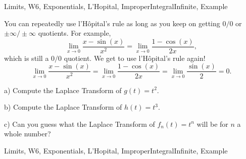 \begin{tagblock}{Limits, W6, Exponentials, L'Hopital, ImproperIntegralInfinite, Example}
\begin{question}
	You can repeatedly use l'H\^opital's rule as long as you keep on getting $0/0$ or $\pm\infty/\pm\infty$ quotients. For example,
\[
\lim_{x\to 0}\frac{x-\sin(x)}{x^2}=\lim_{x\to 0}\frac{1-\cos(x)}{2x},
\]
which is still a $0/0$ quotient. We get to use l'H\^opital's rule again!
\[
\lim_{x\to 0}\frac{x-\sin(x)}{x^2}=\lim_{x\to 0}\frac{1-\cos(x)}{2x}=\lim_{x\to 0} \frac {\sin(x)}2=0.
\]

\bigskip

a) Compute the Laplace Transform of $g(t)=t^2$. 

\bigskip

b) Compute the Laplace Transform of $h(t)=t^3$. 

\bigskip

c) Can you guess what the Laplace Transform of $f_n(t)=t^n$ will be for $n$ a whole number?
	
	
\begin{tags}
	    Limits, W6, Exponentials, L'Hopital, ImproperIntegralInfinite, Example
\end{tags}
	
\begin{diary}
	    
\end{diary}
	
\begin{solution}
	  
\end{solution}
	
\end{question}

\end{tagblock}

